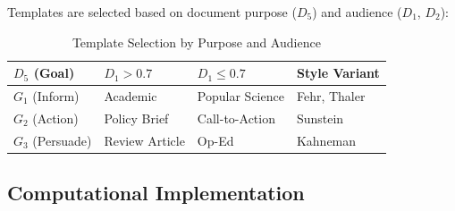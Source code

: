 Templates are selected based on document purpose ($D_5$) and audience ($D_1$, $D_2$):

\begin{table}[htbp]
\centering
\caption{Template Selection by Purpose and Audience}
\label{tab:template-selection}
\renewcommand{\arraystretch}{1.3}
\begin{tabular}{@{}llll@{}}
\toprule
\textbf{$D_5$ (Goal)} & \textbf{$D_1 > 0.7$} & \textbf{$D_1 \leq 0.7$} & \textbf{Style Variant} \\
\midrule
$G_1$ (Inform) & Academic & Popular Science & Fehr, Thaler \\
$G_2$ (Action) & Policy Brief & Call-to-Action & Sunstein \\
$G_3$ (Persuade) & Review Article & Op-Ed & Kahneman \\
\bottomrule
\end{tabular}
\end{table}

\subsection{Computational Implementation}

